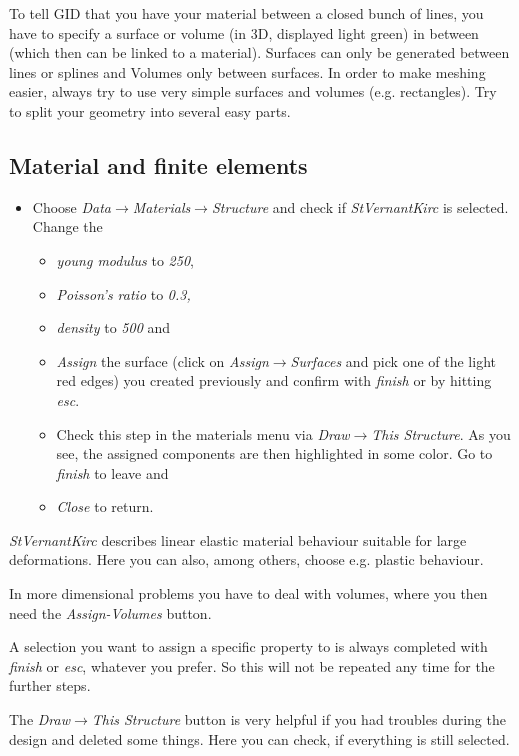 To tell GID that you have your material between a closed bunch of lines, you
have to specify a surface or volume (in 3D, displayed light green)
in between (which then can be linked to a material). Surfaces can
only be generated between lines or splines and Volumes only between
surfaces. In order to make meshing easier, always try to use very
simple surfaces and volumes (e.g. rectangles). Try to split your geometry
into several easy parts.


\subsection{Material and finite elements}

\begin{itemize}
\item Choose \emph{Data$\to$Materials$\to$Structure} and check if \emph{StVernantKirc}
is selected. Change the

\begin{itemize}
\item \emph{young modulus} to \emph{250}, 
\item \emph{Poisson's ratio} to \emph{0.3, }
\item \emph{density} to \emph{500} and 
\item \emph{Assign} the surface (click on \emph{Assign$\to$Surfaces} and
pick one of the light red edges) you created previously and confirm with \emph{finish} or by hitting \emph{esc}. 
\item Check this step in the materials menu via \emph{Draw$\to$This Structure}.
As you see, the assigned components are then highlighted in some color.
Go to \emph{finish} to leave and
\item \emph{Close} to return.
\end{itemize}
\end{itemize}

\emph{StVernantKirc} describes linear elastic material behaviour suitable for large deformations.
Here you can also, among others, choose e.g. plastic behaviour.

In more dimensional problems you have to deal with volumes, where
you then need the \emph{Assign-Volumes} button.

A selection you want to assign a specific property to is always completed with \emph{finish} or \emph{esc}, whatever you prefer. So this will not be repeated any time for the further steps. 


The \emph{Draw$\to$This Structure} button is very helpful if you
had troubles during the design and deleted some things. Here you can
check, if everything is still selected.

